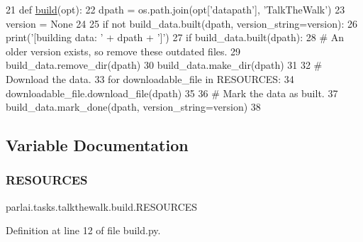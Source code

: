\begin{DoxyCode}
21 \textcolor{keyword}{def }\hyperlink{namespacedialog__babi__feedback_1_1build_a7a9d289f7493a5ded13c4b7f071b6184}{build}(opt):
22     dpath = os.path.join(opt[\textcolor{stringliteral}{'datapath'}], \textcolor{stringliteral}{'TalkTheWalk'})
23     version = \textcolor{keywordtype}{None}
24 
25     \textcolor{keywordflow}{if} \textcolor{keywordflow}{not} build\_data.built(dpath, version\_string=version):
26         print(\textcolor{stringliteral}{'[building data: '} + dpath + \textcolor{stringliteral}{']'})
27         \textcolor{keywordflow}{if} build\_data.built(dpath):
28             \textcolor{comment}{# An older version exists, so remove these outdated files.}
29             build\_data.remove\_dir(dpath)
30         build\_data.make\_dir(dpath)
31 
32         \textcolor{comment}{# Download the data.}
33         \textcolor{keywordflow}{for} downloadable\_file \textcolor{keywordflow}{in} RESOURCES:
34             downloadable\_file.download\_file(dpath)
35 
36         \textcolor{comment}{# Mark the data as built.}
37         build\_data.mark\_done(dpath, version\_string=version)
38 \end{DoxyCode}


\subsection{Variable Documentation}
\mbox{\label{namespaceparlai_1_1tasks_1_1talkthewalk_1_1build_ab1481f6e65d0f57bda65c35ece83acea}} 
\subsubsection{\texorpdfstring{R\+E\+S\+O\+U\+R\+C\+ES}{RESOURCES}}
{\footnotesize\ttfamily parlai.\+tasks.\+talkthewalk.\+build.\+R\+E\+S\+O\+U\+R\+C\+ES}



Definition at line 12 of file build.\+py.

